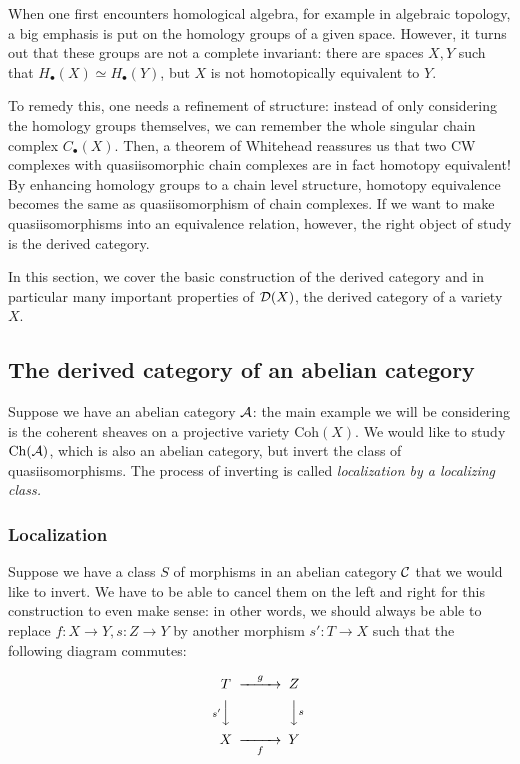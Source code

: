 When one first encounters homological algebra, for example in algebraic topology, a big emphasis is put on the homology groups of a given space. However, it turns out that these groups are not a complete invariant: there are spaces $X,Y$ such that $H_\bullet(X) \simeq H_\bullet(Y)$, but $X$ is not homotopically equivalent to $Y$.

To remedy this, one needs a refinement of structure: instead of only considering the homology groups themselves, we can remember the whole singular chain complex $C_\bullet(X)$. Then, a theorem of Whitehead reassures us that two CW complexes with quasiisomorphic chain complexes are in fact homotopy equivalent! By enhancing homology groups to a chain level structure, homotopy equivalence becomes the same as quasiisomorphism of chain complexes. If we want to make quasiisomorphisms into an equivalence relation, however, the right object of study is the derived category.

In this section, we cover the basic construction of the derived category and in particular many important properties of $\mathcal{D}(X)$, the derived category of a variety $X$.

\subsection{The derived category of an abelian category}

Suppose we have an abelian category $\mathcal{A}$: the main example we will be considering is the coherent sheaves on a projective variety $\mathrm{Coh}(X)$. We would like to study $\mathrm{Ch}(\mathcal{A})$, which is also an abelian category, but invert the class of quasiisomorphisms. The process of inverting is called \emph{localization by a localizing class.}
\subsubsection{Localization}

Suppose we have a class $S$ of morphisms in an abelian category $\mathcal{C}$ that we would like to invert. We have to be able to cancel them on the left and right for this construction to even make sense: in other words, we should always be able to replace $f:X\to Y, s:Z\to Y$ by another morphism $s':T\to X$ such that the following diagram commutes:

\begin{equation*}
    \begin{CD}
        T @>g>> Z \\
          @Vs'VV @VVsV \\
        X @>>f> Y
    \end{CD}
\end{equation*}

